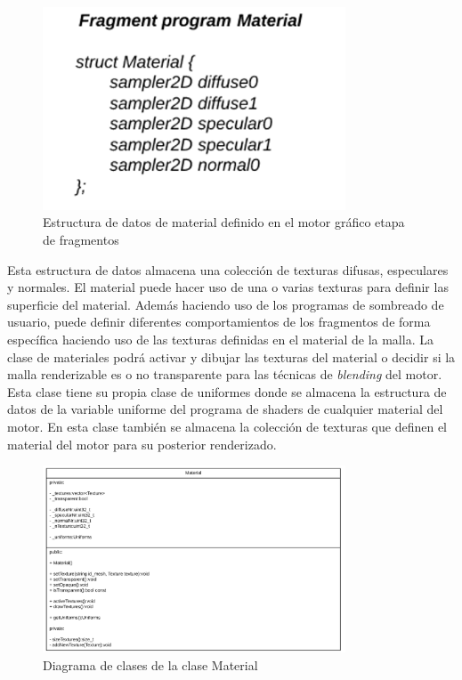 \documentclass[a4paper]{book}
\begin{document}
\begin{figure}[H]
    \centering
    \includegraphics[width=9cm, keepaspectratio]{img/material.png}
    \caption{Estructura de datos de material definido en el motor gráfico etapa de fragmentos}
    \label{Material}
\end{figure}

Esta estructura de datos almacena una colección de texturas difusas, especulares y normales. El material puede hacer uso de una o
varias texturas para definir las superficie del material. Además haciendo uso de los programas de sombreado de usuario, puede definir
diferentes comportamientos de los fragmentos de forma específica haciendo uso de las texturas definidas en el material de la malla. La clase
de materiales podrá activar y dibujar las texturas del material o decidir si la malla renderizable es o no transparente para
las técnicas de \textit{blending} del motor. Esta clase tiene su propia clase de uniformes donde se almacena la estructura de datos de la variable
uniforme del programa de shaders de cualquier material del motor. En esta clase también se almacena la colección de texturas que definen
el material del motor para su posterior renderizado.

\begin{figure}[H]
    \centering
    \includegraphics[width=9cm, keepaspectratio]{img/Material.png}
    \caption{Diagrama de clases de la clase Material}
    \label{material_class}
\end{figure}
\end{document}
